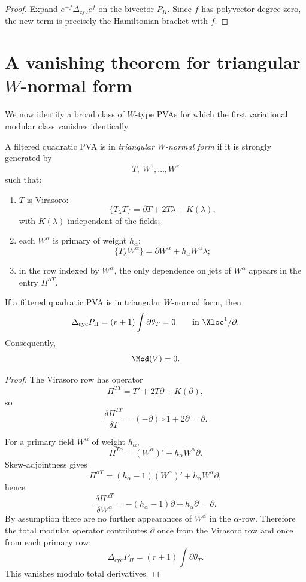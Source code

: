 \begin{proof}
Expand $e^{-f}\Delta_{\mathrm{cyc}}e^f$ on the bivector $P_\Pi$. Since $f$ has polyvector
degree zero, the new term is precisely the Hamiltonian bracket with $f$.
\end{proof}

\section{A vanishing theorem for triangular $W$-normal form}

We now identify a broad class of $W$-type PVAs for which the first variational modular
class vanishes identically.

\begin{definition}
A filtered quadratic PVA is in \emph{triangular $W$-normal form} if it is strongly
generated by
\[
T,\ W^1,\dots,W^r
\]
such that:
\begin{enumerate}[leftmargin=2.4em]
\item $T$ is Virasoro:
\[
\{T_\lambda T\}=\partial T+2T\lambda+K(\lambda),
\]
with $K(\lambda)$ independent of the fields;
\item each $W^\alpha$ is primary of weight $h_\alpha$:
\[
\{T_\lambda W^\alpha\}=\partial W^\alpha+h_\alpha W^\alpha\lambda;
\]
\item in the row indexed by $W^\alpha$, the only dependence on jets of $W^\alpha$
appears in the entry $\Pi^{\alpha T}$.
\end{enumerate}
\end{definition}

\begin{theorem}\label{thm:triangular-vanishing}
If a filtered quadratic PVA is in triangular $W$-normal form, then
\[
\Delta_{\mathrm{cyc}}P_\Pi=(r+1)\int \partial\theta_T=0
\qquad\text{in }\Xloc^1/\partial.
\]
Consequently,
\[
\Mod(V)=0.
\]
\end{theorem}

\begin{proof}
The Virasoro row has operator
\[
\Pi^{TT}=T'+2T\partial+K(\partial),
\]
so
\[
\frac{\delta \Pi^{TT}}{\delta T}=(-\partial)\circ 1 + 2\partial=\partial.
\]

For a primary field $W^\alpha$ of weight $h_\alpha$,
\[
\Pi^{T\alpha}=(W^\alpha)'+h_\alpha W^\alpha\partial.
\]
Skew-adjointness gives
\[
\Pi^{\alpha T}=(h_\alpha-1)(W^\alpha)'+h_\alpha W^\alpha\partial,
\]
hence
\[
\frac{\delta \Pi^{\alpha T}}{\delta W^\alpha}
=-(h_\alpha-1)\partial+h_\alpha\partial=\partial.
\]
By assumption there are no further appearances of $W^\alpha$ in the $\alpha$-row. Therefore
the total modular operator contributes $\partial$ once from the Virasoro row and once from
each primary row:
\[
\Delta_{\mathrm{cyc}}P_\Pi=(r+1)\int \partial \theta_T.
\]
This vanishes modulo total derivatives.
\end{proof}

